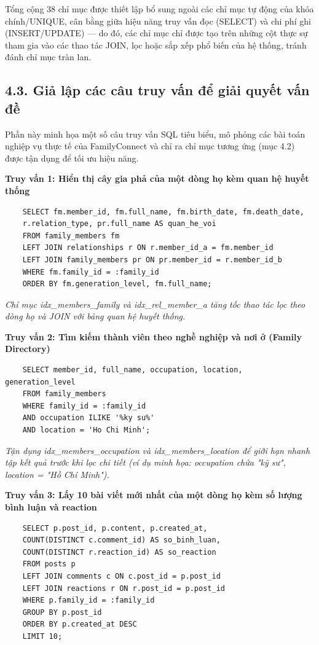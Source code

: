Tổng cộng 38 chỉ mục được thiết lập bổ sung ngoài các chỉ mục tự động của khóa chính/UNIQUE, cân bằng giữa hiệu năng truy vấn đọc (SELECT) và chi phí ghi (INSERT/UPDATE) --- do đó, các chỉ mục chỉ được tạo trên những cột thực sự tham gia vào các thao tác JOIN, lọc hoặc sắp xếp phổ biến của hệ thống, tránh đánh chỉ mục tràn lan.

\subsection{4.3. Giả lập các câu truy vấn để giải quyết vấn đề}
\label{sec:gia_lap_truy_van}

Phần này minh họa một số câu truy vấn SQL tiêu biểu, mô phỏng các bài toán nghiệp vụ thực tế của FamilyConnect và chỉ ra chỉ mục tương ứng (mục 4.2) được tận dụng để tối ưu hiệu năng.

\textbf{Truy vấn 1: Hiển thị cây gia phả của một dòng họ kèm quan hệ huyết thống}

\begin{lstlisting}
	SELECT fm.member_id, fm.full_name, fm.birth_date, fm.death_date,
	r.relation_type, pr.full_name AS quan_he_voi
	FROM family_members fm
	LEFT JOIN relationships r ON r.member_id_a = fm.member_id
	LEFT JOIN family_members pr ON pr.member_id = r.member_id_b
	WHERE fm.family_id = :family_id
	ORDER BY fm.generation_level, fm.full_name;
\end{lstlisting}

\textit{Chỉ mục idx\_members\_family và idx\_rel\_member\_a tăng tốc thao tác lọc theo dòng họ và JOIN với bảng quan hệ huyết thống.}

\textbf{Truy vấn 2: Tìm kiếm thành viên theo nghề nghiệp và nơi ở (Family Directory)}

\begin{lstlisting}
	SELECT member_id, full_name, occupation, location, generation_level
	FROM family_members
	WHERE family_id = :family_id
	AND occupation ILIKE '%ky su%'
	AND location = 'Ho Chi Minh';
\end{lstlisting}

\textit{Tận dụng idx\_members\_occupation và idx\_members\_location để giới hạn nhanh tập kết quả trước khi lọc chi tiết (ví dụ minh họa: occupation chứa "kỹ sư", location = "Hồ Chí Minh").}

\textbf{Truy vấn 3: Lấy 10 bài viết mới nhất của một dòng họ kèm số lượng bình luận và reaction}

\begin{lstlisting}
	SELECT p.post_id, p.content, p.created_at,
	COUNT(DISTINCT c.comment_id) AS so_binh_luan,
	COUNT(DISTINCT r.reaction_id) AS so_reaction
	FROM posts p
	LEFT JOIN comments c ON c.post_id = p.post_id
	LEFT JOIN reactions r ON r.post_id = p.post_id
	WHERE p.family_id = :family_id
	GROUP BY p.post_id
	ORDER BY p.created_at DESC
	LIMIT 10;
\end{lstlisting}

